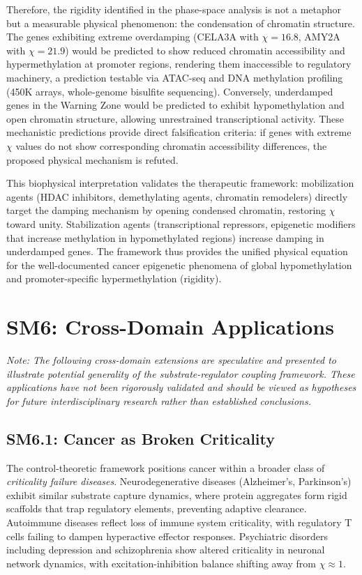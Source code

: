 \documentclass[11pt,letterpaper]{article}
\begin{document}
Therefore, the rigidity identified in the phase-space analysis is not a metaphor but a measurable physical phenomenon: the condensation of chromatin structure. The genes exhibiting extreme overdamping (CELA3A with $\chi = 16.8$, AMY2A with $\chi = 21.9$) would be predicted to show reduced chromatin accessibility and hypermethylation at promoter regions, rendering them inaccessible to regulatory machinery, a prediction testable via ATAC-seq and DNA methylation profiling (450K arrays, whole-genome bisulfite sequencing). Conversely, underdamped genes in the Warning Zone would be predicted to exhibit hypomethylation and open chromatin structure, allowing unrestrained transcriptional activity. These mechanistic predictions provide direct falsification criteria: if genes with extreme $\chi$ values do not show corresponding chromatin accessibility differences, the proposed physical mechanism is refuted.

This biophysical interpretation validates the therapeutic framework: mobilization agents (HDAC inhibitors, demethylating agents, chromatin remodelers) directly target the damping mechanism by opening condensed chromatin, restoring $\chi$ toward unity. Stabilization agents (transcriptional repressors, epigenetic modifiers that increase methylation in hypomethylated regions) increase damping in underdamped genes. The framework thus provides the unified physical equation for the well-documented cancer epigenetic phenomena of global hypomethylation and promoter-specific hypermethylation (rigidity).

\section{SM6: Cross-Domain Applications}

\textit{Note: The following cross-domain extensions are speculative and presented to illustrate potential generality of the substrate-regulator coupling framework. These applications have not been rigorously validated and should be viewed as hypotheses for future interdisciplinary research rather than established conclusions.}

\subsection{SM6.1: Cancer as Broken Criticality}

The control-theoretic framework positions cancer within a broader class of \textit{criticality failure diseases}. Neurodegenerative diseases (Alzheimer's, Parkinson's) exhibit similar substrate capture dynamics, where protein aggregates form rigid scaffolds that trap regulatory elements, preventing adaptive clearance. Autoimmune diseases reflect loss of immune system criticality, with regulatory T cells failing to dampen hyperactive effector responses. Psychiatric disorders including depression and schizophrenia show altered criticality in neuronal network dynamics, with excitation-inhibition balance shifting away from $\chi \approx 1$.
\end{document}
